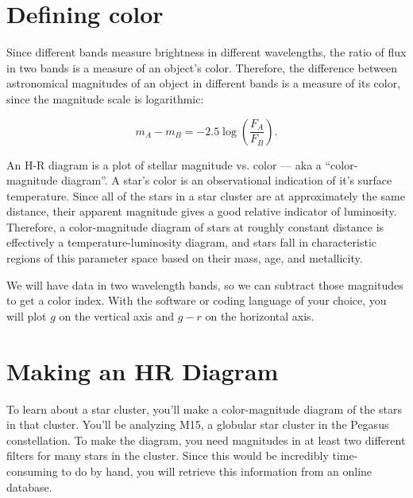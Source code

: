 \section{Defining color}



Since different bands measure brightness in different wavelengths, the ratio of flux in two bands is a measure of an object's color. Therefore, the difference between astronomical magnitudes of an object in different bands is a measure of its color, since the magnitude scale is logarithmic:

\begin{equation}
m_A - m_B = -2.5\log\left(\frac{F_A}{F_B}\right).
\end{equation}

An H-R diagram is a plot of stellar magnitude vs. color --- aka a ``color-magnitude diagram''. A star's color is an observational indication of it's surface temperature. Since all of the stars in a star cluster are at approximately the same distance, their apparent magnitude gives a good relative indicator of luminosity. Therefore, a color-magnitude diagram of stars at roughly constant distance is effectively a temperature-luminosity diagram, and stars fall in characteristic regions of this parameter space based on their mass, age, and metallicity.

We will have data in two wavelength bands, so we can subtract those magnitudes to get a color index. With the software or coding language of your choice, you will plot $g$ on the vertical axis and $g - r$ on the horizontal axis.

\section{Making an HR Diagram}

To learn about a star cluster, you'll make a color-magnitude diagram of the stars in that cluster. You'll be analyzing M15, a globular star cluster in the Pegasus constellation. To make the diagram, you need magnitudes in at least two different filters for many stars in the cluster. Since this would be incredibly time-consuming to do by hand, you will retrieve this information from an online database.

